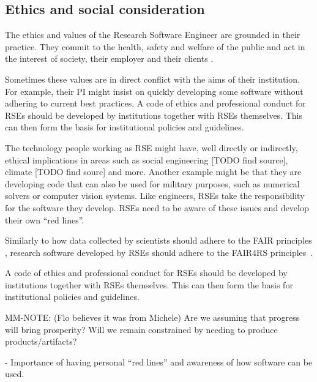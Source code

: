 \documentclass{eceasst}
\begin{document}
\subsection{Ethics and social consideration}

The ethics and values of the Research Software Engineer are grounded in their practice.
They commit to the health, safety and welfare of the public and act in the interest of society, their employer and their clients \cite{Goth2023}.

Sometimes these values are in direct conflict with the aims of their institution. For example, their PI might insist on quickly developing some software without adhering to current best practices.
A code of ethics and professional conduct for RSEs should be developed by institutions together with RSEs themselves. This can then form the basis for institutional policies and guidelines.

The technology people working as RSE might have, well directly or indirectly, ethical implications in areas such as social engineering [TODO find source], climate [TODO find sourc] and more.
Another example might be that they are developing code that can also be used for military purposes, such as numerical solvers or computer vision systems.
Like engineers, RSEs take the responsibility for the software they develop.
RSEs need to be aware of these issues and develop their own ``red lines''.

Similarly to how data collected by scientists should adhere to the FAIR principles \cite{FAIR}, research software developed by RSEs should adhere to the FAIR4RS principles~\cite{FAIR4RS}.

A code of ethics and professional conduct for RSEs should be developed by institutions together with RSEs themselves.
This can then form the basis for institutional policies and guidelines.

MM-NOTE: (Flo believes it was from Michele) Are we assuming that progress will bring prosperity? Will we remain constrained by needing to produce products/artifacts?

  - Importance of having personal “red lines” and awareness of how software can be used.
\end{document}
